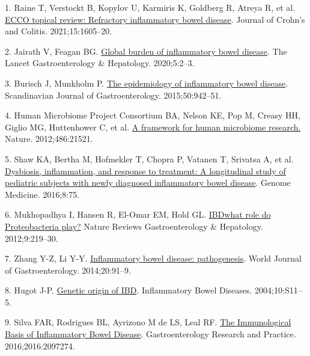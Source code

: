 \documentclass[
  12pt,
  a4paper,
  twoside,
  openright]{book}
\newlength{\cslhangindent}
\newlength{\cslentryspacingunit} %
\newenvironment{CSLReferences}[2] %
 {%
  \setlength{\parindent}{0pt}
  \ifodd #1
  \let\oldpar\par
  \def\par{\hangindent=\cslhangindent\oldpar}
  \fi
  \setlength{\parskip}{#2\cslentryspacingunit}
 }%
 {}
\begin{document}
\hypertarget{refs}{}
\begin{CSLReferences}{0}{0}
\leavevmode{}%
1. Raine T, Verstockt B, Kopylov U, Karmiris K, Goldberg R, Atreya R, et al. \href{https://doi.org/10.1093/ecco-jcc/jjab112}{ECCO topical review: Refractory inflammatory bowel disease}. Journal of Crohn's and Colitis. 2021;15:1605--20.

\leavevmode{}%
2. Jairath V, Feagan BG. \href{https://doi.org/10.1016/S2468-1253(19)30358-9}{Global burden of inflammatory bowel disease}. The Lancet Gastroenterology \& Hepatology. 2020;5:2--3.

\leavevmode{}%
3. Burisch J, Munkholm P. \href{https://doi.org/10.3109/00365521.2015.1014407}{The epidemiology of inflammatory bowel disease}. Scandinavian Journal of Gastroenterology. 2015;50:942--51.

\leavevmode{}%
4. Human Microbiome Project Consortium BA, Nelson KE, Pop M, Creasy HH, Giglio MG, Huttenhower C, et al. \href{https://doi.org/10.1038/nature11209}{A framework for human microbiome research.} Nature. 2012;486:21521.

\leavevmode{}%
5. Shaw KA, Bertha M, Hofmekler T, Chopra P, Vatanen T, Srivatsa A, et al. \href{https://doi.org/10.1186/s13073-016-0331-y}{Dysbiosis, inflammation, and response to treatment: A longitudinal study of pediatric subjects with newly diagnosed inflammatory bowel disease}. Genome Medicine. 2016;8:75.

\leavevmode{}%
6. Mukhopadhya I, Hansen R, El-Omar EM, Hold GL. \href{https://doi.org/10.1038/nrgastro.2012.14}{IBD{\textemdash}what role do Proteobacteria play?} Nature Reviews Gastroenterology \& Hepatology. 2012;9:219--30.

\leavevmode{}%
7. Zhang Y-Z, Li Y-Y. \href{https://doi.org/10.3748/wjg.v20.i1.91}{Inflammatory bowel disease: pathogenesis}. World Journal of Gastroenterology. 2014;20:91--9.

\leavevmode{}%
8. Hugot J-P. \href{https://doi.org/10.1097/00054725-200402001-00003}{Genetic origin of IBD}. Inflammatory Bowel Diseases. 2004;10:S11--5.

\leavevmode{}%
9. Silva FAR, Rodrigues BL, Ayrizono M de LS, Leal RF. \href{https://doi.org/10.1155/2016/2097274}{The Immunological Basis of Inflammatory Bowel Disease}. Gastroenterology Research and Practice. 2016;2016:2097274.


\end{CSLReferences}
\end{document}

